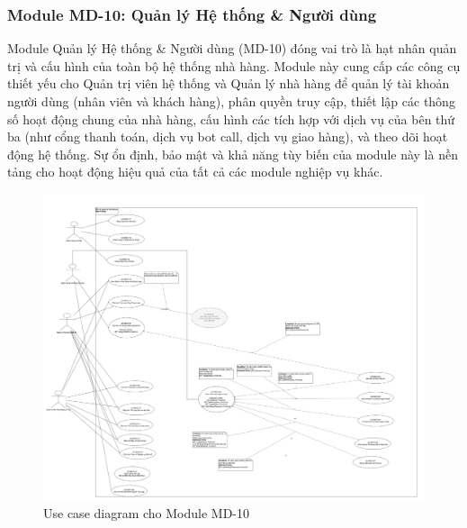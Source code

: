\subsubsection{Module MD-10: Quản lý Hệ thống \& Người 
dùng}
Module Quản lý Hệ thống \& Người dùng (MD-10) đóng vai trò là hạt nhân quản trị và cấu hình của toàn bộ hệ thống nhà hàng. Module này cung cấp các công cụ thiết yếu cho Quản trị viên hệ thống và Quản lý nhà hàng để quản lý tài khoản người dùng (nhân viên và khách hàng), phân quyền truy cập, thiết lập các thông số hoạt động chung của nhà hàng, cấu hình các tích hợp với dịch vụ của bên thứ ba (như cổng thanh toán, dịch vụ bot call, dịch vụ giao hàng), và theo dõi hoạt động hệ thống. Sự ổn định, bảo mật và khả năng tùy biến của module này là nền tảng cho hoạt động hiệu quả của tất cả các module nghiệp vụ khác.


\begin{figure}[H]
    \centering
    \includegraphics[width=15cm]{Sections/tong_quan/functional_spec/img/uc10.png}
    \vspace{0.5cm}
    \caption{Use case diagram cho Module MD-10}
    \label{fig:my_label}
\end{figure}

